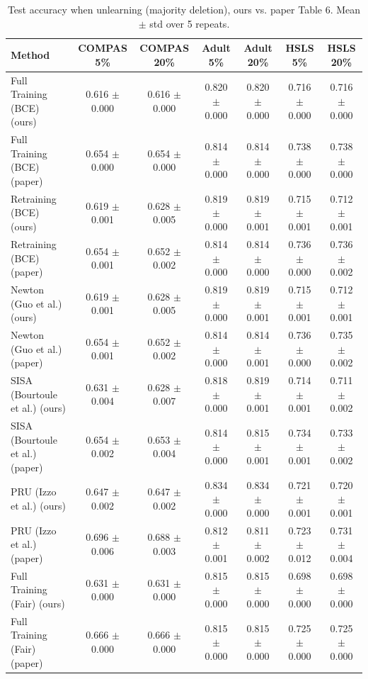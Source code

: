 \begin{table}[t]
\centering
\scriptsize
\caption{Test accuracy when unlearning (majority deletion), ours vs. paper Table 6. Mean $\pm$ std over 5 repeats.}
\label{tab:accuracy_majority}
\begin{tabular}{lcccccc}
\hline
Method & COMPAS 5\% & COMPAS 20\% & Adult 5\% & Adult 20\% & HSLS 5\% & HSLS 20\% \\
\hline
Full Training (BCE) (ours) & 0.616 $\pm$ 0.000 & 0.616 $\pm$ 0.000 & 0.820 $\pm$ 0.000 & 0.820 $\pm$ 0.000 & 0.716 $\pm$ 0.000 & 0.716 $\pm$ 0.000 \\
Full Training (BCE) (paper) & 0.654 $\pm$ 0.000 & 0.654 $\pm$ 0.000 & 0.814 $\pm$ 0.000 & 0.814 $\pm$ 0.000 & 0.738 $\pm$ 0.000 & 0.738 $\pm$ 0.000 \\
Retraining (BCE) (ours) & 0.619 $\pm$ 0.001 & 0.628 $\pm$ 0.005 & 0.819 $\pm$ 0.000 & 0.819 $\pm$ 0.001 & 0.715 $\pm$ 0.001 & 0.712 $\pm$ 0.001 \\
Retraining (BCE) (paper) & 0.654 $\pm$ 0.001 & 0.652 $\pm$ 0.002 & 0.814 $\pm$ 0.000 & 0.814 $\pm$ 0.000 & 0.736 $\pm$ 0.000 & 0.736 $\pm$ 0.002 \\
Newton (Guo et al.) (ours) & 0.619 $\pm$ 0.001 & 0.628 $\pm$ 0.005 & 0.819 $\pm$ 0.000 & 0.819 $\pm$ 0.001 & 0.715 $\pm$ 0.001 & 0.712 $\pm$ 0.001 \\
Newton (Guo et al.) (paper) & 0.654 $\pm$ 0.001 & 0.652 $\pm$ 0.002 & 0.814 $\pm$ 0.000 & 0.814 $\pm$ 0.001 & 0.736 $\pm$ 0.000 & 0.735 $\pm$ 0.002 \\
SISA (Bourtoule et al.) (ours) & 0.631 $\pm$ 0.004 & 0.628 $\pm$ 0.007 & 0.818 $\pm$ 0.000 & 0.819 $\pm$ 0.001 & 0.714 $\pm$ 0.001 & 0.711 $\pm$ 0.002 \\
SISA (Bourtoule et al.) (paper) & 0.654 $\pm$ 0.002 & 0.653 $\pm$ 0.004 & 0.814 $\pm$ 0.000 & 0.815 $\pm$ 0.001 & 0.734 $\pm$ 0.001 & 0.733 $\pm$ 0.002 \\
PRU (Izzo et al.) (ours) & 0.647 $\pm$ 0.002 & 0.647 $\pm$ 0.002 & 0.834 $\pm$ 0.000 & 0.834 $\pm$ 0.000 & 0.721 $\pm$ 0.001 & 0.720 $\pm$ 0.001 \\
PRU (Izzo et al.) (paper) & 0.696 $\pm$ 0.006 & 0.688 $\pm$ 0.003 & 0.812 $\pm$ 0.001 & 0.811 $\pm$ 0.002 & 0.723 $\pm$ 0.012 & 0.731 $\pm$ 0.004 \\
Full Training (Fair) (ours) & 0.631 $\pm$ 0.000 & 0.631 $\pm$ 0.000 & 0.815 $\pm$ 0.000 & 0.815 $\pm$ 0.000 & 0.698 $\pm$ 0.000 & 0.698 $\pm$ 0.000 \\
Full Training (Fair) (paper) & 0.666 $\pm$ 0.000 & 0.666 $\pm$ 0.000 & 0.815 $\pm$ 0.000 & 0.815 $\pm$ 0.000 & 0.725 $\pm$ 0.000 & 0.725 $\pm$ 0.000 \\

\end{tabular}
\end{table}
